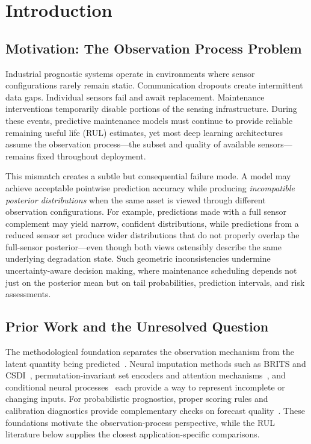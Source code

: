 
\section{Introduction}

\subsection{Motivation: The Observation Process Problem}

Industrial prognostic systems operate in environments where sensor configurations rarely remain static. Communication dropouts create intermittent data gaps. Individual sensors fail and await replacement. Maintenance interventions temporarily disable portions of the sensing infrastructure. During these events, predictive maintenance models must continue to provide reliable remaining useful life (RUL) estimates, yet most deep learning architectures assume the observation process---the subset and quality of available sensors---remains fixed throughout deployment.

This mismatch creates a subtle but consequential failure mode. A model may achieve acceptable pointwise prediction accuracy while producing \emph{incompatible posterior distributions} when the same asset is viewed through different observation configurations. For example, predictions made with a full sensor complement may yield narrow, confident distributions, while predictions from a reduced sensor set produce wider distributions that do not properly overlap the full-sensor posterior---even though both views ostensibly describe the same underlying degradation state. Such geometric inconsistencies undermine uncertainty-aware decision making, where maintenance scheduling depends not just on the posterior mean but on tail probabilities, prediction intervals, and risk assessments.

\subsection{Prior Work and the Unresolved Question}

The methodological foundation separates the observation mechanism from the latent
quantity being predicted~\citep{rubin1976inference,little2019statistical}. Neural
imputation methods such as BRITS and CSDI~\citep{cao2018brits,tashiro2021csdi},
permutation-invariant set encoders and attention mechanisms~\citep{lee2019settransformer,vaswani2017attention,zaheer2017deep},
and conditional neural processes~\citep{garnelo2018cnp} each provide a way to
represent incomplete or changing inputs. For probabilistic prognostics, proper
scoring rules and calibration diagnostics provide complementary checks on forecast
quality~\citep{gneiting2007scoring,kuleshov2018calibrated,angelopoulos202300000101}.
These foundations motivate the observation-process perspective, while the RUL
literature below supplies the closest application-specific comparisons.

